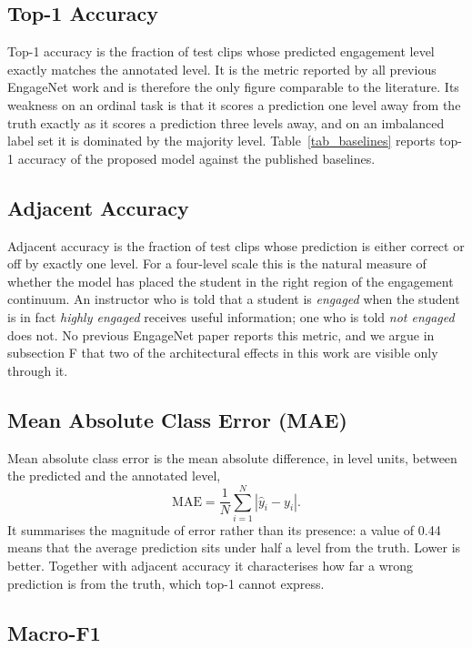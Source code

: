\documentclass[journal]{IEEEtran}
\begin{document}
\subsection{Top-1 Accuracy}

Top-1 accuracy is the fraction of test clips whose predicted engagement level exactly matches the annotated level. It is the metric reported by all previous EngageNet work and is therefore the only figure comparable to the literature. Its weakness on an ordinal task is that it scores a prediction one level away from the truth exactly as it scores a prediction three levels away, and on an imbalanced label set it is dominated by the majority level. Table~\ref{tab_baselines} reports top-1 accuracy of the proposed model against the published baselines.

\subsection{Adjacent Accuracy}

Adjacent accuracy is the fraction of test clips whose prediction is either correct or off by exactly one level. For a four-level scale this is the natural measure of whether the model has placed the student in the right region of the engagement continuum. An instructor who is told that a student is \emph{engaged} when the student is in fact \emph{highly engaged} receives useful information; one who is told \emph{not engaged} does not. No previous EngageNet paper reports this metric, and we argue in subsection F that two of the architectural effects in this work are visible only through it.

\subsection{Mean Absolute Class Error (MAE)}

Mean absolute class error is the mean absolute difference, in level units, between the predicted and the annotated level,
\begin{equation}
\mathrm{MAE} = \frac{1}{N}\sum_{i=1}^{N} |\hat{y}_i - y_i| .
\end{equation}
It summarises the magnitude of error rather than its presence: a value of 0.44 means that the average prediction sits under half a level from the truth. Lower is better. Together with adjacent accuracy it characterises how far a wrong prediction is from the truth, which top-1 cannot express.

\subsection{Macro-F1}
\end{document}
